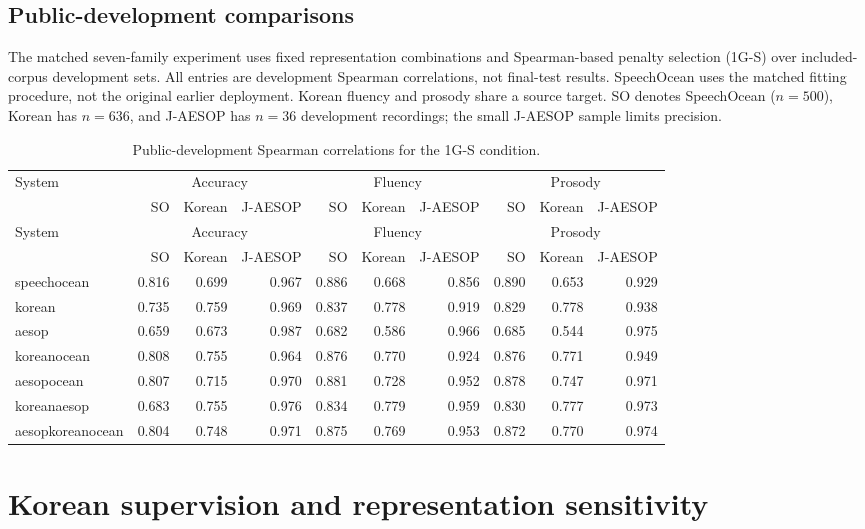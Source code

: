 \documentclass[10pt]{article}
\begin{document}
\begin{landscape}
\section{Public-development comparisons}
The matched seven-family experiment uses fixed representation combinations and Spearman-based penalty selection (1G-S) over included-corpus development sets. All entries are development Spearman correlations, not final-test results. SpeechOcean uses the matched fitting procedure, not the original earlier deployment. Korean fluency and prosody share a source target. SO denotes SpeechOcean ($n=500$), Korean has $n=636$, and J-AESOP has $n=36$ development recordings; the small J-AESOP sample limits precision.
\begin{longtable}{@{}lrrrrrrrrr@{}}
\caption{Public-development Spearman correlations for the 1G-S condition.}\\
\toprule
System & \multicolumn{3}{c}{Accuracy} & \multicolumn{3}{c}{Fluency} & \multicolumn{3}{c}{Prosody}\\
 & SO & Korean & J-AESOP & SO & Korean & J-AESOP & SO & Korean & J-AESOP\\\midrule
\endfirsthead
\toprule
System & \multicolumn{3}{c}{Accuracy} & \multicolumn{3}{c}{Fluency} & \multicolumn{3}{c}{Prosody}\\
 & SO & Korean & J-AESOP & SO & Korean & J-AESOP & SO & Korean & J-AESOP\\\midrule
\endhead
\bottomrule\endfoot
speechocean & 0.816 & 0.699 & 0.967 & 0.886 & 0.668 & 0.856 & 0.890 & 0.653 & 0.929\\
korean & 0.735 & 0.759 & 0.969 & 0.837 & 0.778 & 0.919 & 0.829 & 0.778 & 0.938\\
aesop & 0.659 & 0.673 & 0.987 & 0.682 & 0.586 & 0.966 & 0.685 & 0.544 & 0.975\\
koreanocean & 0.808 & 0.755 & 0.964 & 0.876 & 0.770 & 0.924 & 0.876 & 0.771 & 0.949\\
aesopocean & 0.807 & 0.715 & 0.970 & 0.881 & 0.728 & 0.952 & 0.878 & 0.747 & 0.971\\
koreanaesop & 0.683 & 0.755 & 0.976 & 0.834 & 0.779 & 0.959 & 0.830 & 0.777 & 0.973\\
aesopkoreanocean & 0.804 & 0.748 & 0.971 & 0.875 & 0.769 & 0.953 & 0.872 & 0.770 & 0.974\\
\end{longtable}
\endgroup
\end{landscape}
\section{Korean supervision and representation sensitivity}
\end{document}
